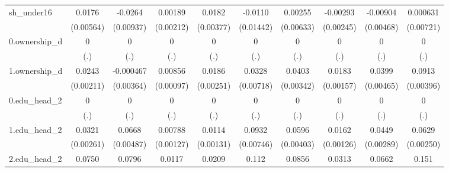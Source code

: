 \begin{table}[htbp]
\begin{tabular}{l*{9}{c}}
sh\_under16  &      0.0176\sym{***}&     -0.0264\sym{***}&     0.00189         &      0.0182\sym{***}&     -0.0110         &     0.00255         &    -0.00293         &    -0.00904\sym{*}  &    0.000631         \\
            &   (0.00564)         &   (0.00937)         &   (0.00212)         &   (0.00377)         &   (0.01442)         &   (0.00633)         &   (0.00245)         &   (0.00468)         &   (0.00721)         \\
0.ownership\_d&           0         &           0         &           0         &           0         &           0         &           0         &           0         &           0         &           0         \\
            &         (.)         &         (.)         &         (.)         &         (.)         &         (.)         &         (.)         &         (.)         &         (.)         &         (.)         \\
1.ownership\_d&      0.0243\sym{***}&   -0.000467         &     0.00856\sym{***}&      0.0186\sym{***}&      0.0328\sym{***}&      0.0403\sym{***}&      0.0183\sym{***}&      0.0399\sym{***}&      0.0913\sym{***}\\
            &   (0.00211)         &   (0.00364)         &   (0.00097)         &   (0.00251)         &   (0.00718)         &   (0.00342)         &   (0.00157)         &   (0.00465)         &   (0.00396)         \\
0.edu\_head\_2&           0         &           0         &           0         &           0         &           0         &           0         &           0         &           0         &           0         \\
            &         (.)         &         (.)         &         (.)         &         (.)         &         (.)         &         (.)         &         (.)         &         (.)         &         (.)         \\
1.edu\_head\_2&      0.0321\sym{***}&      0.0668\sym{***}&     0.00788\sym{***}&      0.0114\sym{***}&      0.0932\sym{***}&      0.0596\sym{***}&      0.0162\sym{***}&      0.0449\sym{***}&      0.0629\sym{***}\\
            &   (0.00261)         &   (0.00487)         &   (0.00127)         &   (0.00131)         &   (0.00746)         &   (0.00403)         &   (0.00126)         &   (0.00289)         &   (0.00250)         \\
2.edu\_head\_2&      0.0750\sym{***}&      0.0796\sym{***}&      0.0117\sym{***}&      0.0209\sym{***}&       0.112\sym{***}&      0.0856\sym{***}&      0.0313\sym{***}&      0.0662\sym{***}&       0.151\sym{***}\\

\end{tabular}
\end{table}
